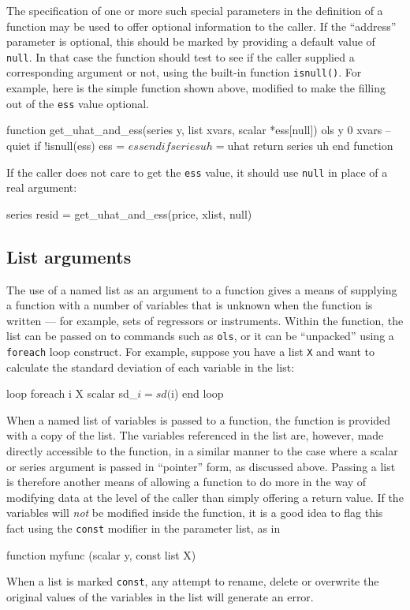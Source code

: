 The specification of one or more such special parameters in the
definition of a function may be used to offer optional information to
the caller.  If the ``address'' parameter is optional, this should be
marked by providing a default value of \texttt{null}.  In that case
the function should test to see if the caller supplied a corresponding
argument or not, using the built-in function \texttt{isnull()}.  For
example, here is the simple function shown above, modified to make the
filling out of the \texttt{ess} value optional.
%
\begin{code}
      function get_uhat_and_ess(series y, list xvars, scalar *ess[null])
        ols y 0 xvars --quiet
        if !isnull(ess) 
           ess = $ess
        endif
        series uh = $uhat
        return series uh
      end function
\end{code}
%
If the caller does not care to get the \texttt{ess} value, it should
use \texttt{null} in place of a real argument:
%
\begin{code}
      series resid = get_uhat_and_ess(price, xlist, null)
\end{code}

\subsection{List arguments}

The use of a named list as an argument to a function gives a means of
supplying a function with a number of variables that is unknown when
the function is written --- for example, sets of regressors or
instruments.  Within the function, the list can be passed on to
commands such as \texttt{ols}, or it can be ``unpacked'' using a
\texttt{foreach} loop construct.  For example, suppose you have a list
\texttt{X} and want to calculate the standard deviation of each
variable in the list:
%
\begin{code}
     loop foreach i X
        scalar sd_$i = sd($i)
     end loop
\end{code}

When a named list of variables is passed to a function, the function
is provided with a copy of the list.  The variables referenced in the
list are, however, made directly accessible to the function, in a
similar manner to the case where a scalar or series argument is passed
in ``pointer'' form, as discussed above.  Passing a list is therefore
another means of allowing a function to do more in the way of
modifying data at the level of the caller than simply offering a
return value.  If the variables will \textit{not} be modified inside
the function, it is a good idea to flag this fact using the
\texttt{const} modifier in the parameter list, as in
%
\begin{code}
     function myfunc (scalar y, const list X)
\end{code}
%
When a list is marked \texttt{const}, any attempt to rename, delete
or overwrite the original values of the variables in the list will
generate an error.

